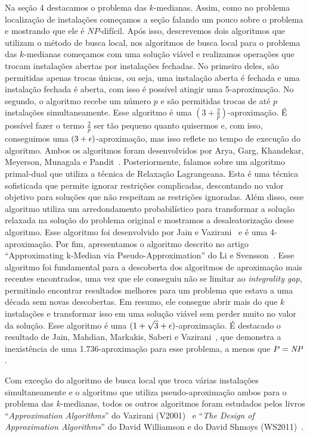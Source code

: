 \documentclass[12pt]{article}
\begin{document}
Na seção 4 destacamos o problema das $k$-medianas. Assim, como no problema localização de instalações começamos a seção falando um pouco sobre o problema e mostrando que ele é $NP$-difícil. Após isso, descrevemos dois algoritmos que utilizam o método de busca local, nos algoritmos de busca local para o problema das $k$-medianas começamos com uma solução viável e realizamos operações que trocam instalações abertas por instalações fechadas. No primeiro deles, são permitidas apenas trocas únicas, ou seja, uma instalação aberta é fechada e uma instalação fechada é aberta, com isso é possível atingir uma 5-aproximação. No segundo, o algoritmo recebe um número $p$ e são permitidas trocas de até $p$ instalações simultaneamente. Esse algoritmo é uma $(3 + \frac{2}{p})$-aproximação. É possível fazer o termo $\frac{2}{p}$ ser tão pequeno quanto quisermos e, com isso, conseguimos uma $(3 + \epsilon)$-aproximação, mas isso reflete no tempo de execução do algoritmo. Ambos os algoritmos foram desenvolvidos por Arya, Garg, Khandekar, Meyerson, Munagala e Pandit~\cite{AryaLocal}. Posteriormente, falamos sobre um algoritmo primal-dual que utiliza a técnica de Relaxação Lagrangeana. Esta é uma técnica sofisticada que permite ignorar restrições complicadas, descontando no valor objetivo para soluções que não respeitam as restrições ignoradas. Além disso, esse algoritmo utiliza um arredondamento probabilístico para transformar a solução relaxada na solução do problema original e mostramos a desaleatorização desse algoritmo. Esse algoritmo foi desenvolvido por Jain e Vazirani~\cite{JV} e é uma 4-aproximação. Por fim, apresentamos o algoritmo descrito no artigo ``Approximating k-Median via Pseudo-Approximation'' do Li e Svensson~\cite{li2012}. Esse algoritmo foi fundamental para a descoberta dos algoritmos de aproximação mais recentes encontrados, uma vez que ele conseguiu não se limitar ao \emph{integrality gap}, permitindo encontrar resultados melhores para um problema que estava a uma década sem novas descobertas. Em resumo, ele consegue abrir mais do que $k$ instalações e transformar isso em uma solução viável sem perder muito no valor da solução. Esse algoritmo é uma $(1 + \sqrt{3} + \epsilon)$-aproximação.
É destacado o resultado de Jain, Mahdian, Markakis, Saberi e Vazirani~\cite{jain2002greedy}, que demonstra a inexistência de uma 1.736-aproximação para esse problema, a menos que $P=\mathit{NP}$.

Com exceção do algoritmo de busca local que troca várias instalações simultaneamente e o algoritmo que utiliza pseudo-aproximação ambos para o problema das $k$-medianas, todos os outros algoritmos foram estudados pelos livros ``\emph{Approximation Algorithms}'' do Vazirani (V2001)~\cite{books/Vazirani} e ``\emph{The Design of Approximation Algorithms}'' do David Williamson e do David Shmoys (WS2011)~\cite{books/WS}.
\end{document}
